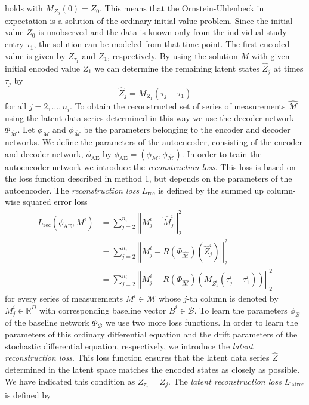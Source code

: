 \documentclass[11pt,titlepage]{article}
\newcommand{\R}{\mathbb{R}} %
\newcommand{\abs}[1]{{\left| #1 \right|}}
\theoremstyle{definition}
\theoremstyle{remark}
\begin{document}
	holds with $M_{Z_0}(0) = Z_0$. This means that the Ornstein-Uhlenbeck in expectation is a solution of the ordinary initial value problem. Since the initial value $Z_0$ is unobserved and the data is known only from the individual study entry $\tau_1$, the solution can be modeled from that time point. The first encoded value is given by $Z_{\tau_1}$ and $Z_1$, respectively. By using the solution $M$ with given initial encoded value $Z_1$ we can determine the remaining latent states $\hat{Z}_j$ at times $\tau_j$ by
	\[\hat{Z}_j = M_{Z_1}(\tau_j - \tau_1)\]
	for all $j=2,\ldots,n_i$. To obtain the reconstructed set of series of measurements $\hat{\mathcal{M}}$ using the latent data series determined in this way we use the decoder network $\Phi_{\hat{\mathcal{M}}}$. Let $\phi_\mathcal{M}$ and $\phi_{\hat{\mathcal{M}}}$ be the parameters belonging to the encoder and decoder networks. We define the parameters of the autoencoder, consisting of the encoder and decoder network, $\phi_\mathrm{AE}$ by $\phi_\mathrm{AE}= (\phi_\mathcal{M},\phi_{\hat{\mathcal{M}}})$. In order to train the autoencoder network we introduce the \textsl{reconstruction loss}. This loss is based on the loss function described in method 1, but depends on the parameters of the autoencoder. The \textsl{reconstruction loss} $L_\mathrm{rec}$ is defined by the summed up column-wise squared error loss
	\begin{align*}
		L_{\mathrm{rec}}(\phi_\mathrm{AE}, M^i) &= \sum_{j=2}^{n_i} \abs{\abs{M^i_j- \hat{M}^i_j}}_2^2\\
		&= \sum_{j=2}^{n_i} \abs{\abs{M^i_j- R(\Phi_{\hat{\mathcal{M}}})(\hat{Z}^i_j)}}_2^2\\
		&= \sum_{j=2}^{n_i} \abs{\abs{M^i_j- R(\Phi_{\hat{\mathcal{M}}})(M_{Z^i_1}(\tau^i_j -\tau^i_1))}}_2^2
	\end{align*}
	for every series of measurements $M^i\in \mathcal{M}$ whose $j$-th column is denoted by $M^i_j\in\R^D$ with corresponding baseline vector $B^i\in\mathcal{B}$. To learn the parameters $\phi_\mathcal{B}$ of the baseline network $\Phi_\mathcal{B}$ we use two more loss functions. 
	In order to learn the parameters of this ordinary differential equation and the drift parameters of the stochastic differential equation, respectively, we introduce the \textsl{latent reconstruction loss}. This loss function ensures that the latent data series $\hat{Z}$ determined in the latent space matches the encoded states as closely as possible. We have indicated this condition as $Z_{\tau_j}=Z_j$. 
	The \textsl{latent reconstruction loss} $L_\mathrm{latrec}$ is defined by
\end{document}
